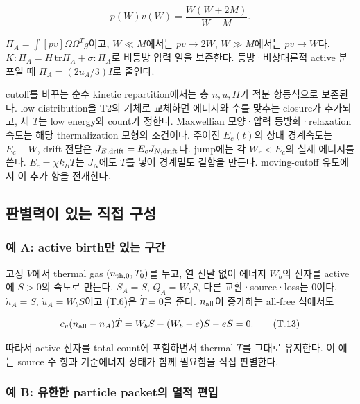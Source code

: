 \documentclass[11pt,a4paper]{article}
\begin{document}
\[
p(W)v(W)=\frac{W(W+2M)}{W+M}.
\tag{T.12}
\]

\(\Pi_A=\int[pv]\Omega\Omega^Tg\)이고, \(W\ll M\)에서는 \(pv\to2W\), \(W\gg M\)에서는 \(pv\to W\)다. \(K:\Pi_A=H\,\mathrm{tr}\Pi_A+\sigma:\Pi_A\)로 비등방 압력 일을 보존한다. 등방·비상대론적 active 분포일 때 \(\Pi_A=(2u_A/3)I\)로 줄인다.

cutoff를 바꾸는 순수 kinetic repartition에서는 총 \(n,u,\Pi\)가 적분 항등식으로 보존된다. low distribution을 T2의 기체로 교체하면 에너지와 수를 맞추는 closure가 추가되고, 새 \(T\)는 low energy와 count가 정한다. Maxwellian 모양·압력 등방화·relaxation 속도는 해당 thermalization 모형의 조건이다. 주어진 \(E_c(t)\)의 상대 경계속도는 \(\dot E_c-\dot W\), drift 전달은 \(J_{E,\rm drift}=E_cJ_{N,\rm drift}\)다. jump에는 각 \(W_r<E_c\)의 실제 에너지를 쓴다. \(E_c=\chi k_BT\)는 \(J_N\)에도 \(\dot T\)를 넣어 경계밀도 결합을 만든다. moving-cutoff 유도에서 이 추가 항을 전개한다.

\hypertarget{uxd310uxbcc4uxb825uxc774-uxc788uxb294-uxc9c1uxc811-uxad6cuxc131}{%
\subsection{판별력이 있는 직접 구성}\label{uxd310uxbcc4uxb825uxc774-uxc788uxb294-uxc9c1uxc811-uxad6cuxc131}}

\hypertarget{uxc608-a-active-birthuxb9cc-uxc788uxb294-uxad6cuxac04}{%
\subsubsection{예 A: active birth만 있는 구간}\label{uxc608-a-active-birthuxb9cc-uxc788uxb294-uxad6cuxac04}}

고정 \(V\)에서 thermal gas \((n_{\rm th,0},T_0)\)를 두고, 열 전달 없이 에너지 \(W_b\)의 전자를 active에 \(S>0\)의 속도로 만든다. \(S_A=S\), \(Q_A=W_bS\), 다른 교환·source·loss는 0이다. \(\dot n_A=S\), \(\dot u_A=W_bS\)이고 (T.6)은 \(\dot T=0\)을 준다. \(n_{\rm all}\)이 증가하는 all-free 식에서도

\[
c_v(n_{\rm all}-n_A)\dot T
=W_bS-(W_b-e)S-eS=0.
\tag{T.13}
\]

따라서 active 전자를 total count에 포함하면서 thermal \(T\)를 그대로 유지한다. 이 예는 source 수 항과 기준에너지 상태가 함께 필요함을 직접 판별한다.

\hypertarget{uxc608-b-uxc720uxd55cuxd55c-particle-packetuxc758-uxc5f4uxc801-uxd3b8uxc785}{%
\subsubsection{예 B: 유한한 particle packet의 열적 편입}\label{uxc608-b-uxc720uxd55cuxd55c-particle-packetuxc758-uxc5f4uxc801-uxd3b8uxc785}}
\end{document}
